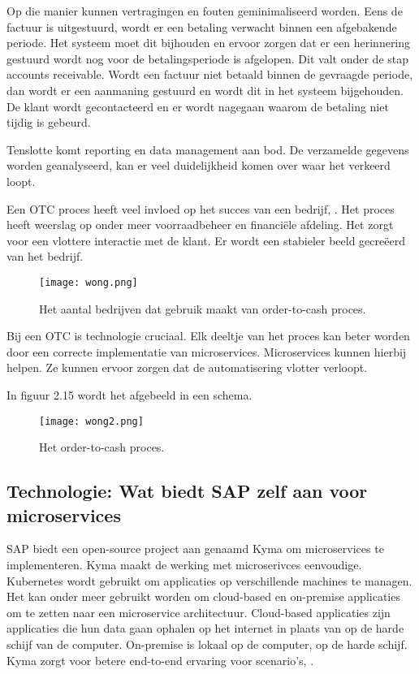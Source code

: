  Op die manier kunnen vertragingen en fouten geminimaliseerd worden. Eens de factuur is uitgestuurd, wordt er een betaling verwacht binnen een afgebakende periode. Het systeem moet dit bijhouden en ervoor zorgen dat er een herinnering gestuurd wordt nog voor de betalingsperiode is afgelopen. Dit valt onder de stap accounts receivable. 
 Wordt een factuur niet betaald binnen de gevraagde periode, dan wordt er een aanmaning gestuurd en wordt dit in het systeem bijgehouden. De klant wordt gecontacteerd en er wordt nagegaan waarom de betaling niet tijdig is gebeurd.
 
Tenslotte komt reporting en data management aan bod. De verzamelde gegevens worden geanalyseerd, kan er veel duidelijkheid komen over waar het verkeerd loopt.

Een OTC proces heeft veel invloed op het succes van een bedrijf, \textcite{Wong2018}. Het proces heeft weerslag op onder meer voorraadbeheer en financiële afdeling. Het zorgt voor een vlottere interactie met de klant. Er wordt een stabieler beeld gecreëerd van het bedrijf. 
 
\begin{figure}[h!]
	\texttt{[image: wong.png]}
	\caption{Het aantal bedrijven dat gebruik maakt van order-to-cash proces. \textcite{Wong2018}}
	\centering
\end{figure}
  
Bij een OTC is technologie cruciaal. Elk deeltje van het proces kan beter worden door een correcte implementatie van microservices. Microservices kunnen hierbij helpen. Ze kunnen ervoor zorgen dat de automatisering vlotter verloopt.

In figuur 2.15 wordt het afgebeeld in een schema.
\begin{figure}[h!]
	\texttt{[image: wong2.png]}
	\caption{Het order-to-cash proces. \textcite{Wong2018}}
	\centering
\end{figure}


\subsection{Technologie: Wat biedt SAP zelf aan voor microservices}
SAP biedt een open-source project aan genaamd Kyma om microservices te implementeren.
Kyma maakt de werking met microserivces eenvoudige. Kubernetes wordt gebruikt om applicaties op verschillende machines te managen. Het kan onder meer gebruikt worden om cloud-based en on-premise applicaties om te zetten naar een microservice architectuur. Cloud-based applicaties zijn applicaties die hun data gaan ophalen op het internet in plaats van op de harde schijf van de computer. On-premise is lokaal op de computer, op de harde schijf. Kyma zorgt voor betere end-to-end ervaring voor scenario's, \textcite{Kyma2019}.

